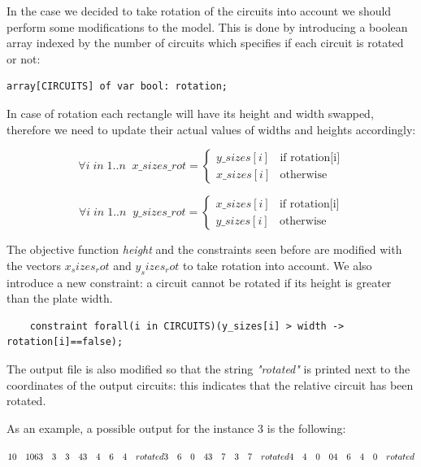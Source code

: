 In the case we decided to take rotation of the circuits into account we should perform some modifications to the model. This is done by introducing a boolean array indexed by the number of circuits which specifies if each circuit is rotated or not:

\begin{verbatim} 
array[CIRCUITS] of var bool: rotation;
\end{verbatim} 

In case of rotation each rectangle will have its height and width swapped, therefore we need to update their actual values of widths and heights accordingly:

\begin{equation*}
\forall i \; in \; 1..n \; \; x\_sizes\_rot  = \begin{cases} y\_sizes[i] & \mbox{if } \mbox{rotation[i]} \\ x\_sizes[i] & \mbox{otherwise}\end{cases}
\end{equation*}

\begin{equation*}
\forall i \; in \; 1..n \; \; y\_sizes\_rot  = \begin{cases} x\_sizes[i] & \mbox{if } \mbox{rotation[i]} \\ y\_sizes[i] & \mbox{otherwise}\end{cases}
\end{equation*}

The objective function \textit{height} and the constraints seen before are modified with the vectors $x_sizes_rot$ and $y_sizes_rot$ to take rotation into account. We also introduce a new constraint: a circuit cannot be rotated if its height is greater than the plate width.

\begin{verbatim}
    constraint forall(i in CIRCUITS)(y_sizes[i] > width -> rotation[i]==false);
\end{verbatim}

The output file is also modified so that the string \textit{"rotated"} is printed next to the coordinates of the output circuits: this indicates that the relative circuit has been rotated. 

As an example, a possible output for the instance 3 is the following:

$ 10 \quad 10 \\
6 \\
3 \quad 3 \quad 3 \quad 4 \\
3 \quad 4 \quad 6 \quad 4 \quad rotated \\
3 \quad 6 \quad 0 \quad 4 \\
3 \quad 7 \quad 3 \quad 7 \quad rotated \\
4 \quad 4 \quad 0 \quad 0 \\
4 \quad 6 \quad 4 \quad 0 \quad rotated $ 

